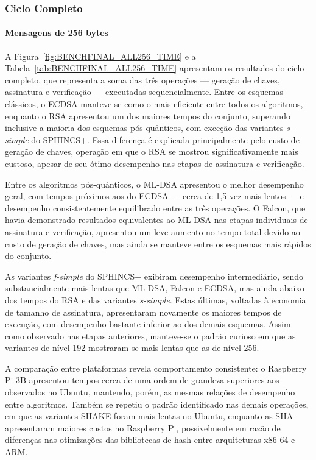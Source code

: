 \subsubsection{Ciclo Completo}
\paragraph{Mensagens de 256 bytes}

A Figura~\ref{fig:BENCHFINAL_ALL256_TIME} e a Tabela~\ref{tab:BENCHFINAL_ALL256_TIME} apresentam os resultados do ciclo completo, que representa a soma das três operações — geração de chaves, assinatura e verificação — executadas sequencialmente. Entre os esquemas clássicos, o ECDSA manteve-se como o mais eficiente entre todos os algoritmos, enquanto o RSA apresentou um dos maiores tempos do conjunto, superando inclusive a maioria dos esquemas pós-quânticos, com exceção das variantes \textit{s-simple} do SPHINCS+. Essa diferença é explicada principalmente pelo custo de geração de chaves, operação em que o RSA se mostrou significativamente mais custoso, apesar de seu ótimo desempenho nas etapas de assinatura e verificação.

Entre os algoritmos pós-quânticos, o ML-DSA apresentou o melhor desempenho geral, com tempos próximos aos do ECDSA — cerca de 1,5 vez mais lentos — e desempenho consistentemente equilibrado entre as três operações. O Falcon, que havia demonstrado resultados equivalentes ao ML-DSA nas etapas individuais de assinatura e verificação, apresentou um leve aumento no tempo total devido ao custo de geração de chaves, mas ainda se manteve entre os esquemas mais rápidos do conjunto.

As variantes \textit{f-simple} do SPHINCS+ exibiram desempenho intermediário, sendo substancialmente mais lentas que ML-DSA, Falcon e ECDSA, mas ainda abaixo dos tempos do RSA e das variantes \textit{s-simple}. Estas últimas, voltadas à economia de tamanho de assinatura, apresentaram novamente os maiores tempos de execução, com desempenho bastante inferior ao dos demais esquemas. Assim como observado nas etapas anteriores, manteve-se o padrão curioso em que as variantes de nível 192 mostraram-se mais lentas que as de nível 256.

A comparação entre plataformas revela comportamento consistente: o Raspberry Pi 3B apresentou tempos cerca de uma ordem de grandeza superiores aos observados no Ubuntu, mantendo, porém, as mesmas relações de desempenho entre algoritmos. Também se repetiu o padrão identificado nas demais operações, em que as variantes SHAKE foram mais lentas no Ubuntu, enquanto as SHA apresentaram maiores custos no Raspberry Pi, possivelmente em razão de diferenças nas otimizações das bibliotecas de hash entre arquiteturas x86-64 e ARM.

